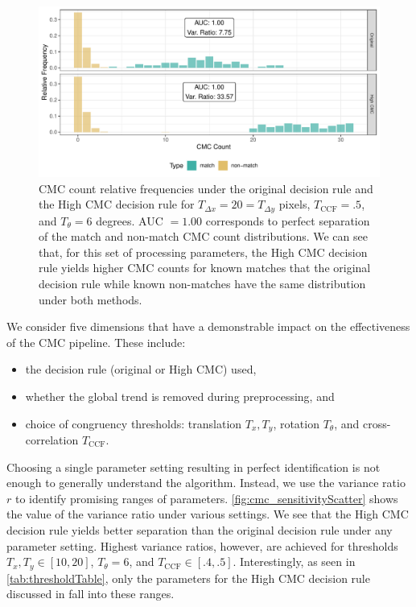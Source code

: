 \begin{Schunk}
\begin{figure}[htbp]

\includegraphics[width=\textwidth]{figures/cmcr-unnamed-chunk-19-1} \hfill{}

\caption{\label{fig:decisionRuleSensitivity_comparison} CMC count relative frequencies under the original decision rule and the High CMC decision rule for $T_{\Delta x} = 20 = T_{\Delta y}$ pixels, $T_{\text{CCF}} = .5$, and $T_{\theta} = 6$ degrees. AUC $= 1.00$ corresponds to perfect separation of the match and non-match CMC count distributions. We can see that, for this set of processing parameters, the High CMC decision rule yields higher CMC counts for known matches that the original decision rule while known non-matches have the same distribution under both methods.}\label{fig:unnamed-chunk-19}
\end{figure}
\end{Schunk}

We consider five dimensions that have a demonstrable impact on the
effectiveness of the CMC pipeline. These include:

\begin{itemize}
\item the decision rule (original or High CMC) used,

\item whether the global trend is removed during preprocessing, and

\item choice of congruency thresholds: translation $T_x, T_y$, rotation $T_\theta$, and cross-correlation $T_{\text{CCF}}$.
\end{itemize}

Choosing a single parameter setting resulting in perfect identification
is not enough to generally understand the algorithm. Instead, we use the
variance ratio \(r\) to identify promising ranges of parameters.
\autoref{fig:cmc_sensitivityScatter} shows the value of the variance
ratio under various settings. We see that the High CMC decision rule
yields better separation than the original decision rule under any
parameter setting. Highest variance ratios, however, are achieved for
thresholds \(T_x, T_y \in [10,20]\), \(T_\theta = 6\), and
\(T_{\text{CCF}} \in [.4,.5]\). Interestingly, as seen in
\autoref{tab:thresholdTable}, only the parameters for the High CMC
decision rule discussed in \citet{song_estimating_2018} fall into these
ranges.

